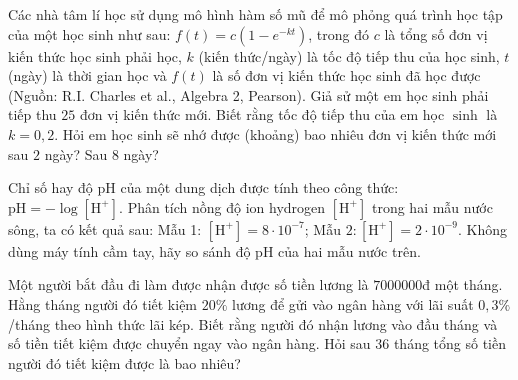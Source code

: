 \begin{bt}%
	Các nhà tâm lí học sử dụng mô hình hàm số mũ để mô phỏng quá trình học tập của một học sinh như sau: $f(t)=c\left(1-e^{-k t}\right)$, trong đó $c$ là tổng số đơn vị kiến thức học sinh phải học, $k$ (kiến thức/ngày) là tốc độ tiếp thu của học sinh, $t$ (ngày) là thời gian học và $f(t)$ là số đơn vị kiến thức học sinh đã học được (Nguồn: R.I. Charles et al., Algebra 2, Pearson). Giả sử một em học sinh phải tiếp thu $25$ đơn vị kiến thức mới. Biết rằng tốc độ tiếp thu của em học $\sinh$ là $k=0{,}2$. Hỏi em học sinh sẽ nhớ được (khoảng) bao nhiêu đơn vị kiến thức mới sau $2$ ngày? Sau $8$ ngày?
\end{bt}

\begin{bt}%
	Chỉ số hay độ pH của một dung dịch được tính theo công thức: $\mathrm{pH}=-\log \left[\mathrm{H}^{+}\right]$. Phân tích nồng độ ion hydrogen $\left[\mathrm{H}^{+}\right]$ trong hai mẫu nước sông, ta có kết quả sau: Mẫu 1: $\left[\mathrm{H}^{+}\right]=8 \cdot 10^{-7}$; Mẫu $2:\left[\mathrm{H}^{+}\right]=2 \cdot 10^{-9}$.
	Không dùng máy tính cầm tay, hãy so sánh độ pH của hai mẫu nước trên.
\end{bt}

\begin{bt}%
	Một người bắt đầu đi làm được nhận được số tiền lương là $7000000$đ một tháng. Hằng tháng người đó tiết kiệm $20\%$ lương để gửi vào ngân hàng với lãi suất $0{,}3\%$/tháng theo hình thức lãi kép. Biết rằng người đó nhận lương vào đầu tháng và số tiền tiết kiệm được chuyển ngay vào ngân hàng. Hỏi sau $36$ tháng tổng số tiền người đó tiết kiệm được là bao nhiêu?
\end{bt}
